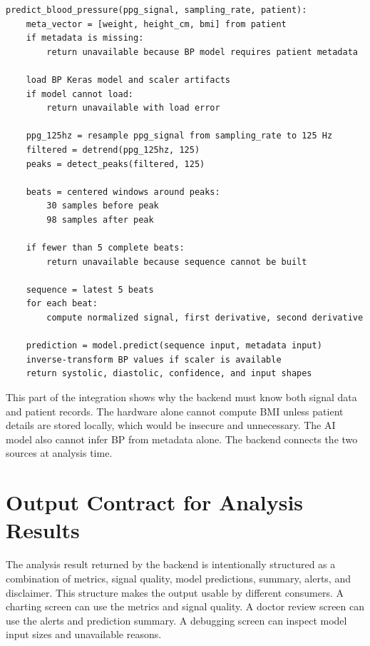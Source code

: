 \begin{lstlisting}[caption={Pseudocode for blood-pressure inference}]
predict_blood_pressure(ppg_signal, sampling_rate, patient):
    meta_vector = [weight, height_cm, bmi] from patient
    if metadata is missing:
        return unavailable because BP model requires patient metadata

    load BP Keras model and scaler artifacts
    if model cannot load:
        return unavailable with load error

    ppg_125hz = resample ppg_signal from sampling_rate to 125 Hz
    filtered = detrend(ppg_125hz, 125)
    peaks = detect_peaks(filtered, 125)

    beats = centered windows around peaks:
        30 samples before peak
        98 samples after peak

    if fewer than 5 complete beats:
        return unavailable because sequence cannot be built

    sequence = latest 5 beats
    for each beat:
        compute normalized signal, first derivative, second derivative

    prediction = model.predict(sequence input, metadata input)
    inverse-transform BP values if scaler is available
    return systolic, diastolic, confidence, and input shapes
\end{lstlisting}

This part of the integration shows why the backend must know both signal data and patient records. The hardware alone cannot compute BMI unless patient details are stored locally, which would be insecure and unnecessary. The AI model also cannot infer BP from metadata alone. The backend connects the two sources at analysis time.

\section{Output Contract for Analysis Results}

The analysis result returned by the backend is intentionally structured as a combination of metrics, signal quality, model predictions, summary, alerts, and disclaimer. This structure makes the output usable by different consumers. A charting screen can use the metrics and signal quality. A doctor review screen can use the alerts and prediction summary. A debugging screen can inspect model input sizes and unavailable reasons.

